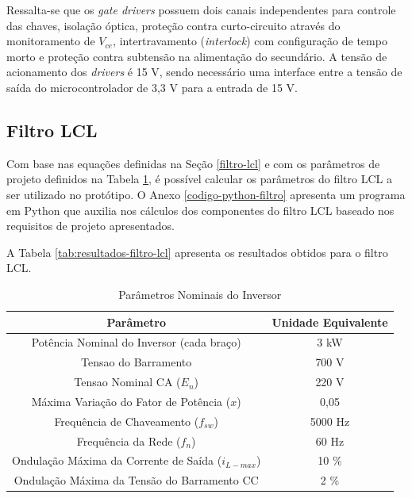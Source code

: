 Ressalta-se que os \textit{gate drivers} possuem dois canais independentes para controle das chaves, isolação óptica, proteção contra curto-circuito através do monitoramento de $V_{ce}$, intertravamento (\textit{interlock}) com configuração de tempo morto e proteção contra subtensão na alimentação do secundário.
A tensão de acionamento dos \textit{drivers} é 15 V, sendo necessário uma interface entre a tensão de saída do microcontrolador de 3,3 V para a entrada de 15 V.

\subsection{Filtro LCL}

Com base nas equações definidas na Seção \ref{filtro-lcl} e com os parâmetros de projeto definidos na Tabela \ref{tab:parametros-inversor}, é possível calcular os parâmetros do filtro LCL a ser utilizado no protótipo.
O Anexo \ref{codigo-python-filtro} apresenta um programa em Python que auxilia nos cálculos dos componentes do filtro LCL baseado nos requisitos de projeto apresentados.

A Tabela \ref{tab:resultados-filtro-lcl} apresenta os resultados obtidos para o filtro LCL.

\begin{table}[h]
	\centering
	\caption{Parâmetros Nominais do Inversor}
	\label{tab:parametros-inversor}
	
	\begin{tabular}{cc}
		\toprule
		\textbf{Parâmetro} & \textbf{Unidade Equivalente} \\
		\midrule
		Potência Nominal do Inversor (cada braço) & 3 kW \\
		Tensao do Barramento & 700 V \\
		Tensao Nominal CA ($E_n$) & 220 V \\
		Máxima Variação do Fator de Potência ($x$) & 0,05 \\
		Frequência de Chaveamento ($f_{sw}$) & 5000 Hz \\
		Frequência da Rede ($f_n$) & 60 Hz \\
		Ondulação Máxima da Corrente de Saída ($i_{L-max}$) &  10 \% \\
		Ondulação Máxima da Tensão do Barramento CC & 2 \% \\
		\bottomrule
	\end{tabular}
\end{table}

